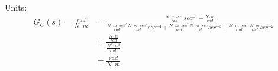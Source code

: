 \documentclass[11pt,letterpaper]{article}
\begin{document}
{    Units:
    \begin{align*}
        G_C(s) = \frac{rad}{N \cdot m} &= \frac{\frac{N \cdot m \cdot sec}{rad}sec^{-1} + \frac{N \cdot m}{rad}}{\frac{N \cdot m \cdot sec^2}{rad}\frac{N \cdot m \cdot sec^2}{rad}sec^{-4} + \frac{N \cdot m \cdot sec^2}{rad}\frac{N \cdot m \cdot sec}{rad}sec^{-3} + \frac{N \cdot m \cdot sec^2}{rad}\frac{N \cdot m}{rad}sec^{-2}} \\
                              &= \frac{\frac{N \cdot m}{rad}}{\frac{N^2 \cdot m^2}{rad^2}} \\
                              &= \frac{rad}{N \cdot m}
    \end{align*}
}
\end{document}
